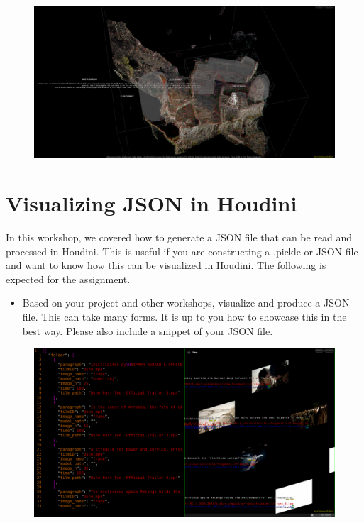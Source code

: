 \documentclass[11pt, a4paper]{article}
\begin{document}
\begin{figure}[h]
	  \centering
	  \includegraphics[width=\textwidth]{media/sora.png}
\end{figure}



\newpage
\section {Visualizing JSON in Houdini}

In this workshop, we covered how to generate a JSON file that can be read and
processed in Houdini. This is useful if you are constructing a .pickle or JSON
file and want to know how this can be visualized in Houdini. The following is
expected for the assignment.

\begin{itemize}
	\item
Based on your project and other workshops, visualize and produce a JSON file.
This can take many forms. It is up to you how to showcase this in the best way.
Please also include a snippet of your JSON file.  \end{itemize}

\begin{figure}[h]
	\includegraphics[width=\textwidth]{media/json_visualizer.png}
\end{figure}
\end{document}
